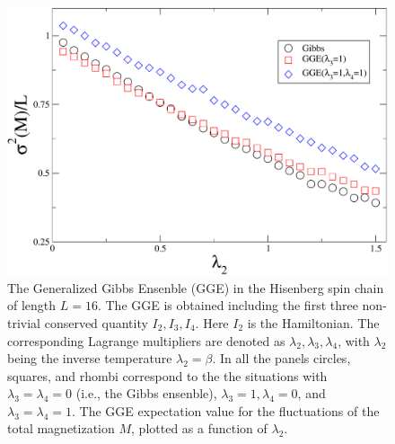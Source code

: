 \documentclass[twocolumn,superscriptaddress,prb,10pt]{revtex4-1}
\begin{document}
\begin{figure}[t]
\includegraphics*[width=0.93\linewidth]{./draft_figs/fig2}
\caption{The Generalized Gibbs Ensenble (GGE) in the Hisenberg spin chain of 
 length $L=16$. The GGE is obtained including the first three non-trivial 
 conserved quantity $I_2, I_3,I_4$. Here $I_2$ is the Hamiltonian. The corresponding 
 Lagrange multipliers are denoted as $\lambda_2,\lambda_3,\lambda_4$, with $\lambda_2$ 
 being the inverse temperature $\lambda_2=\beta$. In all the panels circles, squares, 
 and rhombi correspond to the the situations with $\lambda_3=\lambda_4=0$ 
 (i.e., the Gibbs ensenble), $\lambda_3=1,\lambda_4=0$, and $\lambda_3=\lambda_4=1$.
 The GGE expectation value for the fluctuations of the total magnetization $M$, plotted 
 as a function of $\lambda_2$.
}
\label{fig2}
\end{figure}
\end{document}
